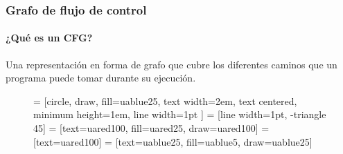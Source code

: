 \begin{frame}[fragile]
\frametitle{Grafo de flujo de control}
\framesubtitle{¿Qué es un CFG?}

Una representación en forma de grafo que cubre los diferentes caminos que un programa puede tomar durante su ejecución.


\begin{figure}
\centering
{} = [circle, draw, fill=uablue25, 
    text width=2em, text centered, minimum height=1em, line width=1pt ]
 = [line width=1pt, -triangle 45]
 = [text=uared100, fill=uared25, draw=uared100]
 = [text=uared100]
 = [text=uablue25, fill=uablue5, draw=uablue25]

\end{figure}



\end{frame}
